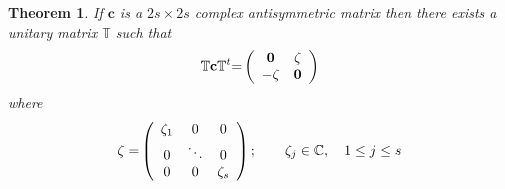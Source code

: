 \documentclass[aps,preprint]{revtex4}%
\newtheorem{theorem}{Theorem}
\begin{document}
\begin{theorem}
If $\mathbf{c}$ is a $2s\times2s$ complex antisymmetric matrix then there
exists a unitary matrix $\mathbb{T}$ such that
\begin{equation}
\mathbb{T}\mathbf{c}\mathbb{T}^{t}\mathbb{=}\left(
\begin{array}
[c]{cc}%
\mathbf{0} & \mathbf{\zeta}\\
-\mathbf{\zeta} & \mathbf{0}%
\end{array}
\right)
\end{equation}
where
\begin{equation}
\mathbf{\zeta=}\left(
\begin{array}
[c]{ccc}%
\zeta_{1} & 0 & 0\\
0 & \ddots & 0\\
0 & 0 & \zeta_{s}%
\end{array}
\right)  ;\qquad\zeta_{j}\in\mathbb{C},\quad1\leq j\leq s
\end{equation}



\end{theorem}
\end{document}

